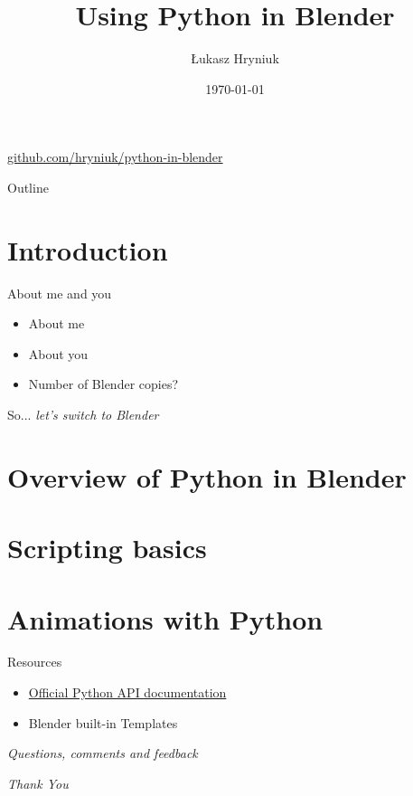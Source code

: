 \documentclass{beamer}
\title[Python in Blender]{Using Python in Blender}
\author{Łukasz Hryniuk}
\date{\today}
\begin{document}
\begin{frame}
  \titlepage
  \centering\href{https://github.com/hryniuk/python-in-blender}{github.com/hryniuk/python-in-blender}
\end{frame}

\begin{frame}{Outline}
  \tableofcontents
\end{frame}

\section{Introduction}

\begin{frame}{About me and you}

\begin{itemize}
\item About me
\item About you
\item Number of Blender copies?
\end{itemize}

\end{frame}


\begin{frame}{So...}
  \centering \Huge
  \emph{let's switch to Blender}
\end{frame}

\section{Overview of Python in Blender}

\section{Scripting basics}

\section{Animations with Python}

\begin{frame}{Resources}

\begin{itemize}
\item \href{https://docs.blender.org/api/current/}{Official Python API documentation}
\item Blender built-in Templates
\end{itemize}

\end{frame}

\begin{frame}{}
  \centering \Huge
  \emph{Questions, comments and feedback}
\end{frame}

\begin{frame}{}
  \centering \Huge
  \emph{Thank You}
\end{frame}
\end{document}
